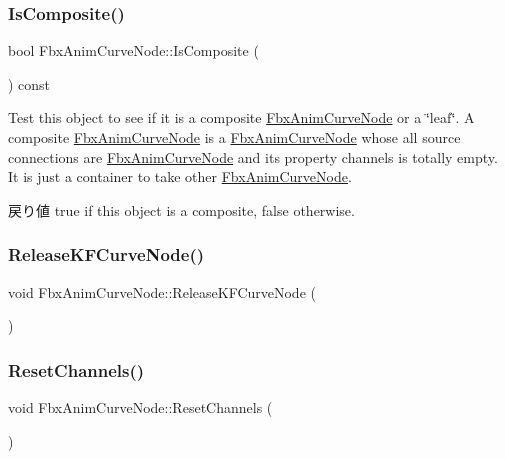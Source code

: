 \subsubsection{\texorpdfstring{Is\+Composite()}{IsComposite()}}
{\footnotesize\ttfamily bool Fbx\+Anim\+Curve\+Node\+::\+Is\+Composite (\begin{DoxyParamCaption}{ }\end{DoxyParamCaption}) const}

Test this object to see if it is a composite \hyperlink{class_fbx_anim_curve_node}{Fbx\+Anim\+Curve\+Node} or a \char`\"{}leaf\char`\"{}. A composite \hyperlink{class_fbx_anim_curve_node}{Fbx\+Anim\+Curve\+Node} is a \hyperlink{class_fbx_anim_curve_node}{Fbx\+Anim\+Curve\+Node} whose all source connections are \hyperlink{class_fbx_anim_curve_node}{Fbx\+Anim\+Curve\+Node} and its property channels is totally empty. It is just a container to take other \hyperlink{class_fbx_anim_curve_node}{Fbx\+Anim\+Curve\+Node}. \begin{DoxyReturn}{戻り値}
{\ttfamily true} if this object is a composite, {\ttfamily false} otherwise. 
\end{DoxyReturn}
\mbox{\label{class_fbx_anim_curve_node_ad38a2414969d07dd7c1905fb8d07a9b5}} 
\subsubsection{\texorpdfstring{Release\+K\+F\+Curve\+Node()}{ReleaseKFCurveNode()}}
{\footnotesize\ttfamily void Fbx\+Anim\+Curve\+Node\+::\+Release\+K\+F\+Curve\+Node (\begin{DoxyParamCaption}{ }\end{DoxyParamCaption})}

\mbox{\label{class_fbx_anim_curve_node_ad334950a15167317fbbc029fe806976d}} 
\subsubsection{\texorpdfstring{Reset\+Channels()}{ResetChannels()}}
{\footnotesize\ttfamily void Fbx\+Anim\+Curve\+Node\+::\+Reset\+Channels (\begin{DoxyParamCaption}{ }\end{DoxyParamCaption})}

